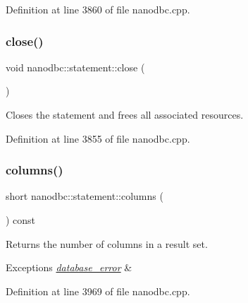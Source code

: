 Definition at line 3860 of file nanodbc.\+cpp.

\mbox{\label{classnanodbc_1_1statement_abcf1dda8ab40a3b8ebd33c69afa4a399}} 
\subsubsection{\texorpdfstring{close()}{close()}}
{\footnotesize\ttfamily void nanodbc\+::statement\+::close (\begin{DoxyParamCaption}{ }\end{DoxyParamCaption})}



Closes the statement and frees all associated resources. 



Definition at line 3855 of file nanodbc.\+cpp.

\mbox{\label{classnanodbc_1_1statement_a750301a6d2cfa67bc32c766edfc7825c}} 
\subsubsection{\texorpdfstring{columns()}{columns()}}
{\footnotesize\ttfamily short nanodbc\+::statement\+::columns (\begin{DoxyParamCaption}{ }\end{DoxyParamCaption}) const}



Returns the number of columns in a result set. 


\begin{DoxyExceptions}{Exceptions}
{\em \mbox{\hyperlink{classnanodbc_1_1database__error}{database\+\_\+error}}} & \\
\hline
\end{DoxyExceptions}


Definition at line 3969 of file nanodbc.\+cpp.

\mbox{\label{classnanodbc_1_1statement_aa4a0bb3fc0112469e837e1acd5ef3f6a}} 
